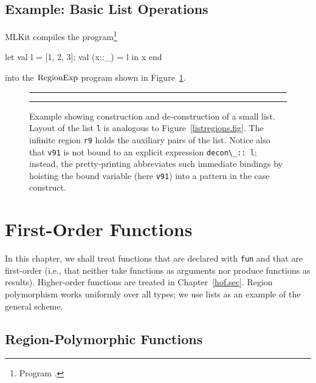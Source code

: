 \documentclass[12pt]{book}
\begin{document}
\section{Example: Basic List Operations}
\label{listexamples.sec}
MLKit compiles the program\footnote{Program .}
\begin{smlcode}
  let val l = [1, 2, 3];
      val (x::_) = l
  in x
  end
\end{smlcode}
into the $\hbox{\rm RegionExp}$ program shown in Figure~\ref{listprint.fig}.
\begin{figure}
\hrule \medskip
{}
\caption{Example showing construction and de-construction of a small list.
  Layout of the list \lstinline{l} is analogous to Figure~\ref{listregions.fig}.  The
  infinite region \lstinline{r9} holds the auxiliary pairs of the list. Notice also
  that \lstinline{v91} is not bound to an explicit expression \lstinline{decon\_:: l};
  instead, the pretty-printing abbreviates such immediate bindings by hoisting
  the bound variable (here \lstinline{v91}) into a pattern in the case construct.}
\label{listprint.fig}
\medskip

\hrule
\end{figure}


\chapter{First-Order Functions}
In this chapter, we shall treat
%
%
%
functions that are declared with \lstinline{fun} and that are first-order (i.e.,
that neither take functions as arguments nor produce functions as
results). Higher-order functions are treated in Chapter~\ref{hof.sec}.  Region
polymorphism works uniformly over all types; we use lists as an example of the
general scheme.

\section{Region-Polymorphic Functions}
\label{region-polymorphic-functions.sec}
\end{document}
